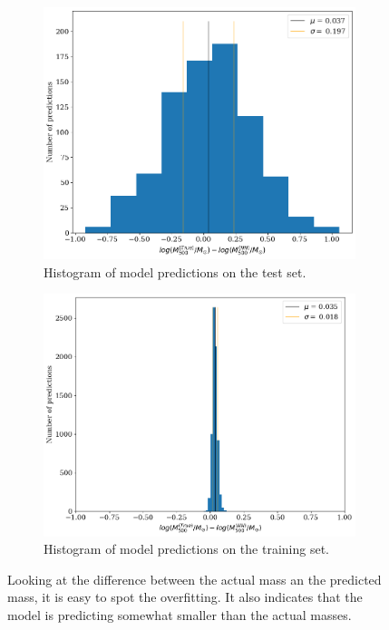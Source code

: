 \begin{figure}[H]
\centering
\begin{subfigure}{.46\textwidth}
  \centering
  \includegraphics[width=\linewidth]{images/Chapter4/Basic CNN/overf_test_set_hist.png}
  \caption{Histogram of model predictions on the test set.}
  \label{fig:overf_comp_test_hist}
\end{subfigure}%
\hspace{.6em}
\begin{subfigure}{.46\textwidth}
  \centering
  \includegraphics[width=\linewidth]{images/Chapter4/Basic CNN/overf_train_set_hist.png}
  \caption{Histogram of model predictions on the training set.}
  \label{fig:overf_comp_train_hist}
\end{subfigure}
\caption{Looking at the difference between the actual mass an the predicted mass, it is easy to spot the overfitting. It also indicates that the model is predicting somewhat smaller than the actual masses.} 
\label{fig:overf_comp_hist}
\end{figure}

